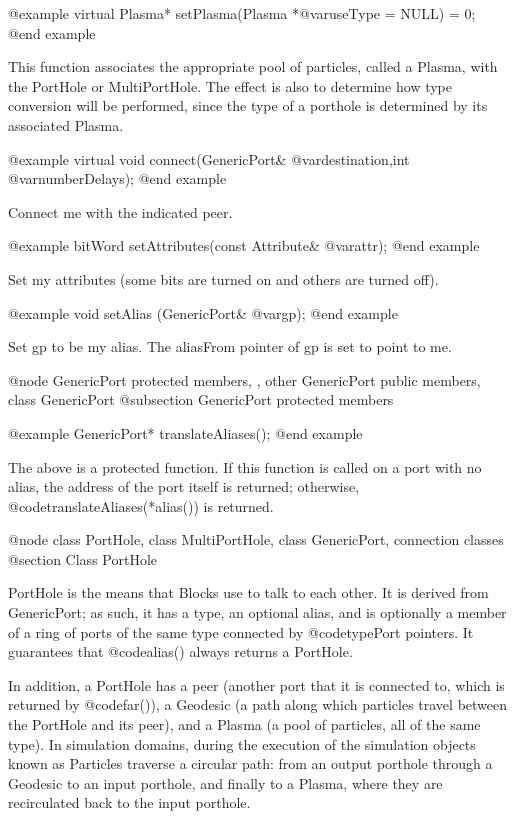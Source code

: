 @example
virtual Plasma* setPlasma(Plasma *@var{useType} = NULL) = 0;
@end example

This function associates the appropriate pool of particles, called a
Plasma, with the PortHole or MultiPortHole.  The effect is also to
determine how type conversion will be performed, since the type of
a porthole is determined by its associated Plasma.

@example
virtual void connect(GenericPort& @var{destination},int @var{numberDelays});
@end example

Connect me with the indicated peer.

@example
bitWord setAttributes(const Attribute& @var{attr});
@end example

Set my attributes (some bits are turned on and others are turned off).

@example
void setAlias (GenericPort& @var{gp});
@end example

Set gp to be my alias.  The aliasFrom pointer of gp is set to
point to me.

@node GenericPort protected members,  , other GenericPort public members, class GenericPort
@subsection GenericPort protected members

@example
GenericPort* translateAliases();
@end example

The above is a protected function.  If this function is called on
a port with no alias, the address of the port itself is returned;
otherwise, @code{translateAliases(*alias())} is returned.

@node class PortHole, class MultiPortHole, class GenericPort, connection classes
@section Class PortHole

PortHole is the means that Blocks use to talk to each other.  It is
derived from GenericPort; as such, it has a type, an optional alias,
and is optionally a member of a ring of ports of the same type connected
by @code{typePort} pointers.  It guarantees that @code{alias()} always
returns a PortHole.

In addition, a PortHole has a peer (another port that it is connected
to, which is returned by @code{far()}), a Geodesic (a path along which
particles travel between the PortHole and its peer), and a Plasma (a
pool of particles, all of the same type).  In simulation domains,
during the execution of the simulation objects known as Particles
traverse a circular path: from an output porthole through a Geodesic to
an input porthole, and finally to a Plasma, where they are recirculated
back to the input porthole.

